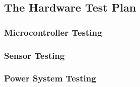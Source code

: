\subsection{The Hardware Test Plan}
\subsubsection{Microcontroller Testing}
\subsubsection{Sensor Testing}
\subsubsection{Power System Testing}

